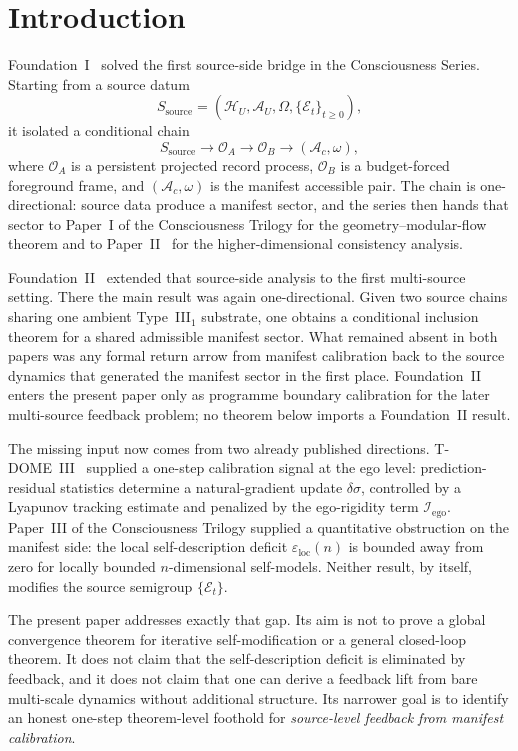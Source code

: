 \documentclass[12pt]{article}
\theoremstyle{definition}
\theoremstyle{remark}
\begin{document}
\clearpage
\tableofcontents
\clearpage

\section{Introduction}\label{sec:intro}

Foundation~I~\cite{FoundationI} solved the first source-side bridge in
the Consciousness Series. Starting from a source datum
\[
S_{\mathrm{source}}
=
(\mathcal H_U,\mathcal A_U,\Omega,\{\mathcal E_t\}_{t\ge 0}),
\]
it isolated a conditional chain
\[
S_{\mathrm{source}}
\to
\mathcal O_A
\to
\mathcal O_B
\to
(\mathcal A_c,\omega),
\]
where \(\mathcal O_A\) is a persistent projected record process,
\(\mathcal O_B\) is a budget-forced foreground frame, and
\((\mathcal A_c,\omega)\) is the manifest accessible pair. The chain is
one-directional: source data produce a manifest sector, and the series
then hands that sector to Paper~I of the Consciousness Trilogy
\cite{PaperI} for the geometry--modular-flow theorem and to
Paper~II~\cite{PaperII} for the higher-dimensional consistency analysis.

Foundation~II~\cite{FoundationII} extended that source-side analysis to
the first multi-source setting. There the main result was again
one-directional. Given two source chains sharing one ambient
Type~III\(_1\) substrate, one obtains a conditional inclusion theorem
for a shared admissible manifest sector. What remained absent in both
papers was any formal return arrow from manifest calibration back to the
source dynamics that generated the manifest sector in the first place.
Foundation~II enters the present paper only as programme boundary
calibration for the later multi-source feedback problem; no theorem
below imports a Foundation~II result.

The missing input now comes from two already published directions.
T-DOME~III~\cite{TDOMEIII} supplied a one-step calibration signal at the
ego level: prediction-residual statistics determine a natural-gradient
update \(\delta\sigma\), controlled by a Lyapunov tracking estimate and
penalized by the ego-rigidity term
\(\mathcal I_{\mathrm{ego}}\). Paper~III of the Consciousness Trilogy
\cite{PaperIII} supplied a quantitative obstruction on the manifest
side: the local self-description deficit
\(\varepsilon_{\mathrm{loc}}(n)\) is bounded away from zero for
locally bounded \(n\)-dimensional self-models. Neither result, by
itself, modifies the source semigroup \(\{\mathcal E_t\}\).

The present paper addresses exactly that gap. Its aim is not to prove a
global convergence theorem for iterative self-modification or a general
closed-loop theorem. It does not claim that the self-description deficit
is eliminated by feedback, and it does not claim that one can derive a
feedback lift from bare multi-scale dynamics without additional
structure. Its narrower goal is to identify an honest one-step
theorem-level foothold for \emph{source-level feedback from manifest
calibration}.
\end{document}
